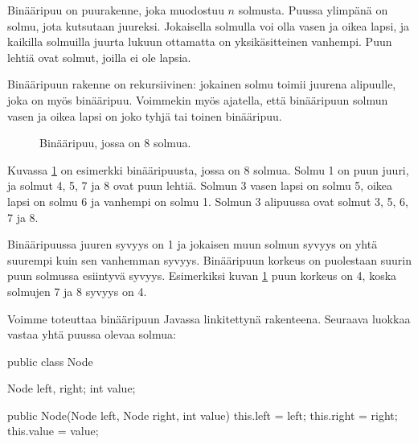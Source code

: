 Binääripuu on puurakenne, joka muodostuu $n$ solmusta.
Puussa ylimpänä on solmu, jota kutsutaan juureksi.
Jokaisella solmulla voi olla vasen ja oikea lapsi,
ja kaikilla solmuilla juurta lukuun ottamatta on yksikäsitteinen vanhempi.
Puun lehtiä ovat solmut, joilla ei ole lapsia.

Binääripuun rakenne on rekursiivinen:
jokainen solmu toimii juurena alipuulle,
joka on myös binääripuu.
Voimmekin myös ajatella, että binääripuun
solmun vasen ja oikea lapsi on joko tyhjä
tai toinen binääripuu.

\begin{figure}
\center
{}
\caption{Binääripuu, jossa on 8 solmua.}
\label{fig:binpuu}
\end{figure}

Kuvassa \ref{fig:binpuu} on esimerkki binääripuusta, jossa on 8 solmua.
Solmu 1 on puun juuri, ja solmut 4, 5, 7 ja 8 ovat puun lehtiä.
Solmun 3 vasen lapsi on solmu 5, oikea lapsi on solmu 6
ja vanhempi on solmu 1.
Solmun 3 alipuussa ovat solmut 3, 5, 6, 7 ja 8.

Binääripuussa juuren syvyys on 1 ja jokaisen muun solmun syvyys on yhtä
suurempi kuin sen vanhemman syvyys.
Binääripuun korkeus on puolestaan suurin puun solmussa
esiintyvä syvyys.
Esimerkiksi kuvan \ref{fig:binpuu} puun korkeus on 4,
koska solmujen 7 ja 8 syvyys on 4.

Voimme toteuttaa binääripuun Javassa linkitettynä rakenteena.
Seuraava luokkaa vastaa yhtä puussa olevaa solmua:

\begin{code}
public class Node {
    Node left, right;
    int value;

    public Node(Node left, Node right, int value) {
        this.left = left;
        this.right = right;
        this.value = value;
    }
}
\end{code}

